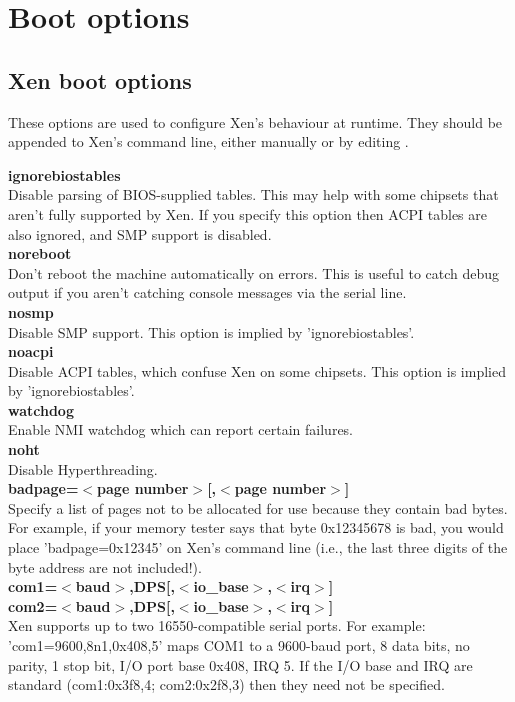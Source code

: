 \documentclass[11pt,twoside,final,openright]{xenstyle}
\begin{document}
{\chapter{Boot options}

\section{Xen boot options}

These options are used to configure Xen's behaviour at runtime.  They
should be appended to Xen's command line, either manually or by
editing .

{\bf ignorebiostables }\\
 Disable parsing of BIOS-supplied tables. This may help with some
 chipsets that aren't fully supported by Xen. If you specify this
 option then ACPI tables are also ignored, and SMP support is
 disabled. \\

{\bf noreboot } \\
 Don't reboot the machine automatically on errors.  This is
 useful to catch debug output if you aren't catching console messages
 via the serial line. \\

{\bf nosmp } \\
 Disable SMP support.
 This option is implied by 'ignorebiostables'. \\

{\bf noacpi } \\
 Disable ACPI tables, which confuse Xen on some chipsets.
 This option is implied by 'ignorebiostables'. \\

{\bf watchdog } \\
 Enable NMI watchdog which can report certain failures. \\

{\bf noht } \\
 Disable Hyperthreading. \\

{\bf badpage=$<$page number$>$[,$<$page number$>$] } \\
 Specify a list of pages not to be allocated for use 
 because they contain bad bytes. For example, if your
 memory tester says that byte 0x12345678 is bad, you would
 place 'badpage=0x12345' on Xen's command line (i.e., the
 last three digits of the byte address are not
 included!). \\

{\bf com1=$<$baud$>$,DPS[,$<$io\_base$>$,$<$irq$>$] \\
 com2=$<$baud$>$,DPS[,$<$io\_base$>$,$<$irq$>$] } \\
 Xen supports up to two 16550-compatible serial ports.
 For example: 'com1=9600,8n1,0x408,5' maps COM1 to a
 9600-baud port, 8 data bits, no parity, 1 stop bit,
 I/O port base 0x408, IRQ 5.
 If the I/O base and IRQ are standard (com1:0x3f8,4;
 com2:0x2f8,3) then they need not be specified. \\

}
\end{document}
